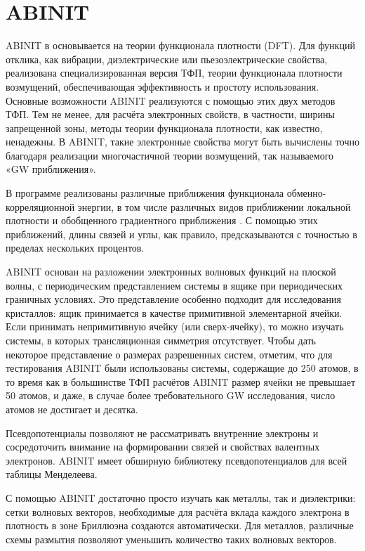 \section{ABINIT}
ABINIT в основывается на теории функционала плотности (DFT). Для функций отклика, как вибрации, диэлектрические или пьезоэлектрические свойства,  реализована специализированная версия ТФП, теории функционала плотности возмущений, обеспечивающая эффективность и простоту использования. Основные возможности ABINIT реализуются с помощью этих двух методов ТФП. Тем не менее, для расчёта электронных свойств, в частности, ширины запрещенной зоны, методы теории функционала плотности, как известно, ненадежны. В ABINIT, такие электронные свойства могут быть вычислены точно благодаря реализации многочастичной теории возмущений, так называемого «GW приближения».

В программе реализованы различные приближения функционала обменно-корреляционной энергии, в том числе различных видов приближении локальной плотности и обобщенного градиентного приближения . С помощью этих приближений, длины связей и углы, как правило, предсказываются с точностью в пределах нескольких процентов.

ABINIT основан на разложении электронных волновых функций на плоской волны, с периодическим представлением системы в ящике при периодических граничных условиях. Это представление особенно подходит для исследования кристаллов: ящик принимается в качестве примитивной элементарной ячейки. Если принимать непримитивную ячейку (или сверх-ячейку), то можно изучать системы, в которых трансляционная симметрия отсутствует. Чтобы дать некоторое представление о размерах разрешенных систем, отметим, что для тестирования  ABINIT были использованы системы, содержащие до 250 атомов, в то время как в большинстве  ТФП расчётов ABINIT размер ячейки не превышает 50 атомов, и даже, в случае более требовательного GW исследования, число атомов не достигает и десятка.

Псевдопотенциалы позволяют не рассматривать внутренние электроны и сосредоточить внимание на формировании связей и свойствах валентных электронов. ABINIT имеет обширную библиотеку псевдопотенциалов для всей таблицы Менделеева.

С помощью ABINIT достаточно просто изучать как металлы, так и диэлектрики: сетки волновых векторов, необходимые для расчёта вклада каждого электрона в плотность в зоне Бриллюэна создаются автоматически. Для металлов, различные схемы размытия позволяют уменьшить количество таких волновых векторов.

